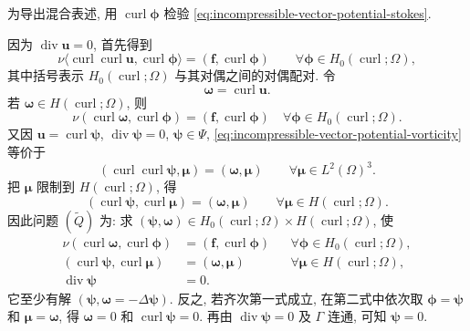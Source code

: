 为导出混合表述, 用 $\operatorname{curl}\boldsymbol\phi$
检验 \eqref{eq:incompressible-vector-potential-stokes}.

因为 $\operatorname{div}\mathbf u=0$, 首先得到
\[
\nu\langle\operatorname{curl}\operatorname{curl}\mathbf u,
\operatorname{curl}\boldsymbol\phi\rangle
=(\mathbf f,\operatorname{curl}\boldsymbol\phi)
\qquad\forall\boldsymbol\phi\in H_0(\operatorname{curl};\Omega),
\]
其中括号表示 $H_0(\operatorname{curl};\Omega)$ 与其对偶之间的对偶配对.
令
\begin{equation}\label{eq:incompressible-vector-potential-vorticity}
\boldsymbol\omega=\operatorname{curl}\mathbf u.
\end{equation}
若 $\boldsymbol\omega\in H(\operatorname{curl};\Omega)$, 则
\[
\nu(\operatorname{curl}\boldsymbol\omega,
\operatorname{curl}\boldsymbol\phi)
=(\mathbf f,\operatorname{curl}\boldsymbol\phi)
\quad\forall\boldsymbol\phi\in H_0(\operatorname{curl};\Omega).
\]
又因 $\mathbf u=\operatorname{curl}\boldsymbol\psi$,
$\operatorname{div}\boldsymbol\psi=0$, $\boldsymbol\psi\in\Psi$,
\eqref{eq:incompressible-vector-potential-vorticity} 等价于
\[
(\operatorname{curl}\operatorname{curl}\boldsymbol\psi,\boldsymbol\mu)
=(\boldsymbol\omega,\boldsymbol\mu)
\qquad\forall\boldsymbol\mu\in L^2(\Omega)^3.
\]
把 $\boldsymbol\mu$ 限制到 $H(\operatorname{curl};\Omega)$, 得
\[
(\operatorname{curl}\boldsymbol\psi,
\operatorname{curl}\boldsymbol\mu)
=(\boldsymbol\omega,\boldsymbol\mu)
\qquad\forall\boldsymbol\mu\in H(\operatorname{curl};\Omega).
\]
因此问题 $(\widetilde Q)$ 为: 求
$(\boldsymbol\psi,\boldsymbol\omega)
\in H_0(\operatorname{curl};\Omega)\times
H(\operatorname{curl};\Omega)$, 使
\begin{align}
\nu(\operatorname{curl}\boldsymbol\omega,
\operatorname{curl}\boldsymbol\phi)
&=(\mathbf f,\operatorname{curl}\boldsymbol\phi)
&&\forall\boldsymbol\phi\in H_0(\operatorname{curl};\Omega),
\label{eq:incompressible-vector-potential-mixed-first}\\
(\operatorname{curl}\boldsymbol\psi,
\operatorname{curl}\boldsymbol\mu)
&=(\boldsymbol\omega,\boldsymbol\mu)
&&\forall\boldsymbol\mu\in H(\operatorname{curl};\Omega),
\label{eq:incompressible-vector-potential-mixed-second}\\
\operatorname{div}\boldsymbol\psi&=0.
\label{eq:incompressible-vector-potential-divergence-free}
\end{align}
它至少有解 $(\boldsymbol\psi,\boldsymbol\omega=-\Delta\boldsymbol\psi)$.
反之, 若齐次第一式成立, 在第二式中依次取
$\boldsymbol\phi=\boldsymbol\psi$ 和
$\boldsymbol\mu=\boldsymbol\omega$, 得
$\boldsymbol\omega=0$ 和
$\operatorname{curl}\boldsymbol\psi=0$.
再由 $\operatorname{div}\boldsymbol\psi=0$ 及 $\Gamma$ 连通,
可知 $\boldsymbol\psi=0$.

